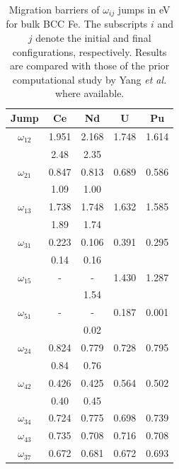 \documentclass[preprint,12pt]{elsarticle}
\begin{document}
\begin{table}[!ht]
    \centering
    \caption{Migration barriers of $\omega_{ij}$ jumps in eV for bulk BCC Fe. The subscripts $i$ and $j$ denote the initial and final configurations, respectively. Results are compared with those of the prior computational study by Yang \textit{et al.} \cite{yang_significant_2023} where available.}
    \label{tab:migration_barriers}
    \begin{tabular}{|c|c|c|c|c|}
      \hline
      Jump &Ce &Nd &U  &Pu  \\
      \hline
       $\omega_{12}$  &1.951 &2.168 &1.748 &1.614 \\
       &2.48 \cite{yang_significant_2023}& 2.35 \cite{yang_significant_2023}&&\\
       \hline
       $\omega_{21}$  &0.847 &0.813 &0.689 &0.586 \\
       &1.09 \cite{yang_significant_2023}& 1.00 \cite{yang_significant_2023}&&\\
       \hline
       $\omega_{13}$  &1.738 &1.748 &1.632 &1.585 \\
       &1.89 \cite{yang_significant_2023}& 1.74 \cite{yang_significant_2023}&&\\
       \hline
       $\omega_{31}$  &0.223 &0.106 &0.391 &0.295 \\
       &0.14 \cite{yang_significant_2023}& 0.16 \cite{yang_significant_2023}&&\\
       \hline
       $\omega_{15}$  &- &- &1.430 &1.287 \\ 
       && 1.54 \cite{yang_significant_2023}&&\\
       \hline
       $\omega_{51}$  &- &- &0.187 &0.001 \\
       && 0.02 \cite{yang_significant_2023}&&\\
       \hline
       $\omega_{24}$  &0.824 &0.779 &0.728 &0.795 \\ 
       &0.84 \cite{yang_significant_2023} & 0.76 \cite{yang_significant_2023}&&\\
       \hline
       $\omega_{42}$  &0.426 &0.425 &0.564 &0.502 \\
       &0.40 \cite{yang_significant_2023} & 0.45 \cite{yang_significant_2023}&&\\
       \hline
       $\omega_{34}$  &0.724 &0.775 &0.698 &0.739 \\ 
       \hline
       $\omega_{43}$  &0.735 &0.708 &0.716 &0.708 \\
       \hline
       $\omega_{37}$ &0.672 &0.681 &0.672 &0.693 \\

\end{tabular}
\end{table}
\end{document}
